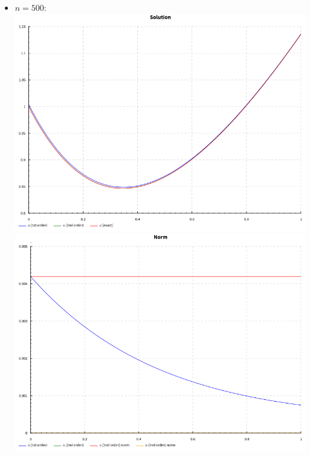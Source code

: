 \documentclass[a4paper,12pt]{article}
\begin{document}
\begin{flushleft}
\begin{itemize}
    \item $n=500$:\linebreak
      \includegraphics[scale=0.6]{solution_500.png}\linebreak
      \includegraphics[scale=0.6]{norm_500.png}\linebreak
  \end{itemize}
\end{flushleft}
\end{document}
